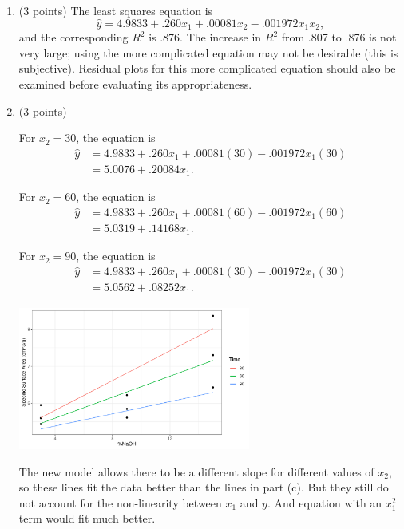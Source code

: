 \documentclass{article}\usepackage[]{graphicx}\usepackage[]{color}
\newenvironment{knitrout}{}{} %
\begin{document}
\begin{enumerate}
\begin{enumerate}
  \item (3 points)
  The least squares equation is
  \[\hat{y} = 4.9833 + .260 x_1 + .00081 x_2 - .001972 x_1 x_2,\]
  and the corresponding $R^2$ is .876. The increase in $R^2$ from .807 to .876 is not very large; using the more complicated equation may not be desirable (this is subjective). Residual plots for this more complicated equation should also be examined before evaluating its appropriateness.
  
  \item (3 points)
  
  For $x_2 = 30$, the equation is
  \begin{align*}
  \hat{y} &= 4.9833 + .260 x_1 + .00081(30) - .001972 x_1 (30)\\
  &= 5.0076 + .20084 x_1.
  \end{align*}
  
  For $x_2 = 60$, the equation is
  \begin{align*}
  \hat{y} &= 4.9833 + .260 x_1 + .00081(60) - .001972 x_1 (60)\\
  &= 5.0319 + .14168 x_1.
  \end{align*}
  
  For $x_2 = 90$, the equation is
  \begin{align*}
  \hat{y} &= 4.9833 + .260 x_1 + .00081(30) - .001972 x_1 (30)\\
  &= 5.0562 + .08252 x_1.
  \end{align*}
  
\begin{knitrout}
\color{fgcolor}

{\centering \includegraphics[width=0.6\textwidth]{figure/unnamed-chunk-11-1} 

}



\end{knitrout}
  
  The new model allows there to be a different slope for different values of $x_2$, so these lines fit the data better than the lines in part (c). But they still do not account for the non-linearity between $x_1$ and $y$. And equation with an $x_1^2$ term would fit much better.
  

\end{enumerate}
\end{enumerate}
\end{document}
